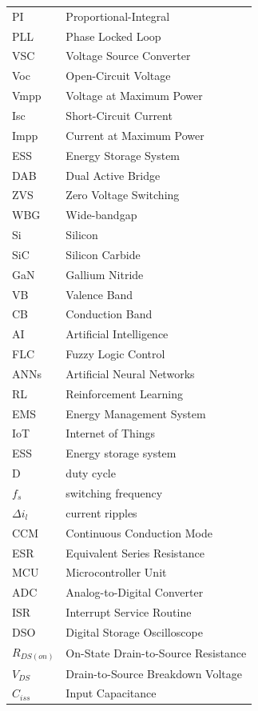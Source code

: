 \begin{longtable}{p{3cm}p{11cm}}
PI   & Proportional-Integral  \\
PLL  & Phase Locked Loop  \\
VSC  & Voltage Source Converter  \\
Voc  & Open-Circuit Voltage  \\
Vmpp  & Voltage at Maximum Power  \\
Isc  & Short-Circuit Current  \\
Impp  & Current at Maximum Power \\
ESS  & Energy Storage System  \\
DAB  & Dual Active Bridge  \\
ZVS  & Zero Voltage Switching  \\
WBG  & Wide-bandgap  \\
Si  & Silicon  \\
SiC  & Silicon Carbide  \\
GaN  & Gallium Nitride  \\
VB  & Valence Band  \\
CB  & Conduction Band  \\
AI  & Artificial Intelligence  \\
FLC  & Fuzzy Logic Control  \\
ANNs  & Artificial Neural Networks  \\
RL  & Reinforcement Learning  \\
EMS  & Energy Management System  \\
IoT  & Internet of Things  \\
ESS & Energy storage system \\
D & duty cycle  \\
$f_{s}$  & switching frequency  \\
$\Delta i_{l}$ & current ripples \\
CCM & Continuous Conduction Mode \\
ESR & Equivalent Series Resistance \\
MCU & Microcontroller Unit \\
ADC & Analog-to-Digital Converter \\
ISR & Interrupt Service Routine \\
DSO & Digital Storage Oscilloscope \\
$R_{DS(on)}$ & On-State Drain-to-Source Resistance \\
$V_{DS}$ & Drain-to-Source Breakdown Voltage \\
$C_{iss}$ & Input Capacitance \\

\end{longtable}
